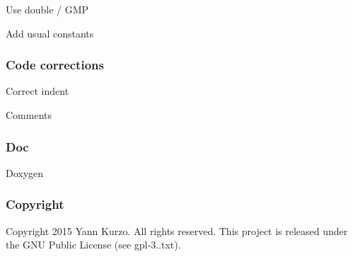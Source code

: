 \begin{DoxyItemize}
\item Use double / G\+M\+P
\item Add usual constants
\end{DoxyItemize}

\subsubsection*{Code corrections}


\begin{DoxyItemize}
\item Correct indent
\item Comments
\end{DoxyItemize}

\subsubsection*{Doc}


\begin{DoxyItemize}
\item Doxygen
\end{DoxyItemize}

\subsubsection*{Copyright}

Copyright 2015 Yann Kurzo. All rights reserved. This project is released under the G\+N\+U Public License (see gpl-\/3..\+txt). 